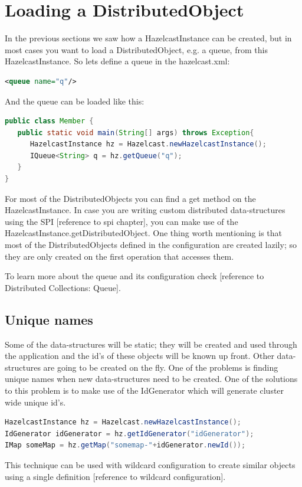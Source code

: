 \section{Loading a DistributedObject}
In the previous sections we saw how a HazelcastInstance can be created, but in most cases you want to load a DistributedObject, e.g. a queue, from this HazelcastInstance. So lets define a queue in the hazelcast.xml:
\begin{lstlisting}[language=xml]
<queue name="q"/>
\end{lstlisting}
And the queue can be loaded like this:
\begin{lstlisting}[language=java]
public class Member {
   public static void main(String[] args) throws Exception{
      HazelcastInstance hz = Hazelcast.newHazelcastInstance();
      IQueue<String> q = hz.getQueue("q");
   }
}
\end{lstlisting}
For most of the DistributedObjects you can find a get method on the HazelcastInstance. In case you are writing custom distributed data-structures using the SPI [reference to spi chapter], you can make use of the HazelcastInstance.getDistributedObject. One thing worth mentioning is that most of the DistributedObjects defined in the configuration are created lazily; so they are only created on the first operation that accesses them.

To learn more about the queue and its configuration check [reference to Distributed Collections: Queue].
\subsection{Unique names}
Some of the data-structures will be static; they will be created and used through the application and the id's of these objects will be known up front. Other data-structures are going to be created on the fly. One of the problems is finding unique names when new data-structures need to be created. One of the solutions to this problem is to make use of the IdGenerator which will generate cluster wide unique id's. 

\begin{lstlisting}[language=java]
HazelcastInstance hz = Hazelcast.newHazelcastInstance();
IdGenerator idGenerator = hz.getIdGenerator("idGenerator");
IMap someMap = hz.getMap("somemap-"+idGenerator.newId());
\end{lstlisting}
This technique can be used with wildcard configuration to create similar objects using a single definition [reference to wildcard configuration]. 

